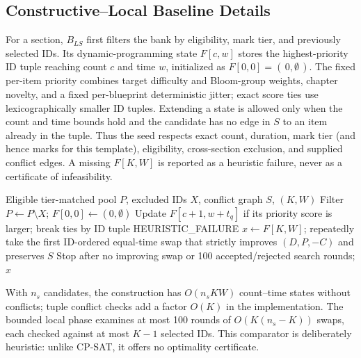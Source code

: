 \documentclass[runningheads]{llncs}
\begin{document}
\subsection{Constructive--Local Baseline Details}
For a section, $B_{LS}$ first filters the bank by eligibility, mark tier, and previously selected IDs. Its dynamic-programming state $F[c,w]$ stores the highest-priority ID tuple reaching count $c$ and time $w$, initialized as $F[0,0]=(\,0,\emptyset\,)$. The fixed per-item priority combines target difficulty and Bloom-group weights, chapter novelty, and a fixed per-blueprint deterministic jitter; exact score ties use lexicographically smaller ID tuples. Extending a state is allowed only when the count and time bounds hold and the candidate has no edge in $S$ to an item already in the tuple. Thus the seed respects exact count, duration, mark tier (and hence marks for this template), eligibility, cross-section exclusion, and supplied conflict edges. A missing $F[K,W]$ is reported as a heuristic failure, never as a certificate of infeasibility.

\begin{algorithm}[t]
\caption{Constructive--local baseline ($B_{LS}$) for one section}
\label{alg:bls}
\begin{algorithmic}[1]
\Require Eligible tier-matched pool $P$, excluded IDs $X$, conflict graph $S$, $(K,W)$
\State Filter $P\gets P\setminus X$; $F[0,0]\gets(0,\emptyset)$
      \State Update $F[c+1,w+t_q]$ if its priority score is larger; break ties by ID tuple
    \EndIf
  \EndFor
\EndFor
{} \Return HEURISTIC\_FAILURE \EndIf
\State $x\gets F[K,W]$; repeatedly take the first ID-ordered equal-time swap that strictly improves $(D,P,-C)$ and preserves $S$
\State Stop after no improving swap or 100 accepted/rejected search rounds; \Return $x$
\end{algorithmic}
\end{algorithm}

With $n_s$ candidates, the construction has $O(n_s K W)$ count--time states without conflicts; tuple conflict checks add a factor $O(K)$ in the implementation. The bounded local phase examines at most 100 rounds of $O(K(n_s-K))$ swaps, each checked against at most $K-1$ selected IDs. This comparator is deliberately heuristic: unlike CP-SAT, it offers no optimality certificate.
\end{document}
